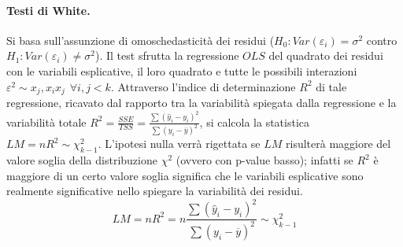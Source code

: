 \documentclass[a4page, 11pt]{article} %
\begin{document}
\paragraph{Testi di White. } Si basa sull’assunzione di omoschedasticità dei residui ($H_0: Var(\varepsilon_i) = \sigma^2$ contro $H_1: Var(\varepsilon_i) \neq \sigma^2$). %
Il test sfrutta la regressione $OLS$ del quadrato dei residui con le variabili esplicative, il loro quadrato e tutte le possibili interazioni $\varepsilon^2 \sim x_j, x_ix_j \hspace{5pt} \forall i, j < k$. %
Attraverso l'indice di determinazione $R^2$ di tale regressione, ricavato dal rapporto tra la variabilità spiegata dalla regressione e la variabilità totale $R^2 = \frac{SSE}{TSS} = \frac{\sum(\hat{y}_i - y_i)^2}{\sum(y_i - \overline{y})^2}$, si calcola la statistica $LM = n R^2 \sim \chi^2_{k-1}$.
L’ipotesi nulla verrà rigettata se $LM$ risulterà maggiore del valore soglia della distribuzione $\chi^2$ (ovvero con p-value basso); %
infatti se $R^2$ è maggiore di un certo valore soglia significa che le variabili esplicative sono realmente significative nello spiegare la variabilità dei residui.
\begin{equation*}
  LM = nR^2 = n\frac{\sum(\hat{y}_i - y_i)^2}{\sum(y_i - \overline{y})^2} \sim \chi^2_{k-1}
\end{equation*}
\end{document}
